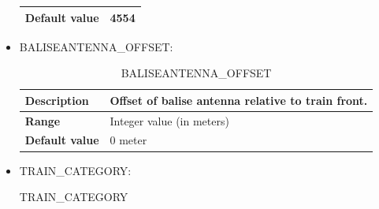 \begin{itemize}
\begin{longtable}{|l|l|}
				\hline

					\begin{minipage}[t]{0.22\linewidth} \textbf{Default value}	\end{minipage}
				&	\begin{minipage}[t]{0.78\linewidth} 4554 \end{minipage} \\

				\hline

			\end{longtable}

		\item BALISEANTENNA\_OFFSET:

			\begin{longtable}{|l|l|}
				\caption{BALISEANTENNA\_OFFSET}\\
				\hline

					\begin{minipage}[t]{0.22\linewidth} \textbf{Description}	\end{minipage}
				&	\begin{minipage}[t]{0.78\linewidth} Offset of balise antenna relative to train front. \end{minipage} \\

				\hline

					\begin{minipage}[t]{0.22\linewidth} \textbf{Range}	\end{minipage}
				&	\begin{minipage}[t]{0.78\linewidth} Integer value (in meters) \end{minipage} \\

				\hline

					\begin{minipage}[t]{0.22\linewidth} \textbf{Default value}	\end{minipage}
				&	\begin{minipage}[t]{0.78\linewidth} 0 meter \end{minipage} \\

				\hline

			\end{longtable}

		\item TRAIN\_CATEGORY:

			\begin{longtable}{|l|l|}
				\caption{TRAIN\_CATEGORY}\\
				\hline


\end{longtable}
\end{itemize}
